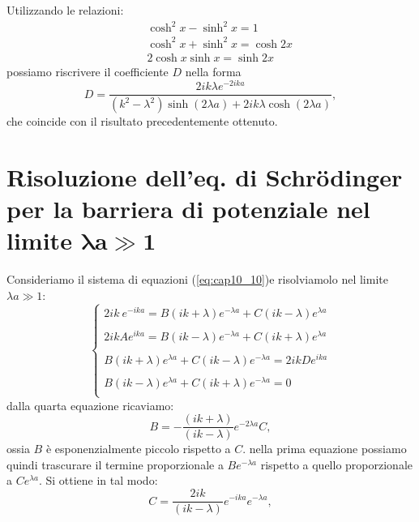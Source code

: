 Utilizzando le relazioni:
\begin{eqnarray}
& &\cosh ^2 x - \sinh ^2 x=1 \nonumber \\
& &\cosh ^2 x + \sinh ^2 x=\cosh 2x  \\
& &2 \cosh  x \sinh  x=\sinh 2x \nonumber 
\end{eqnarray}
possiamo riscrivere il coefficiente $D$ nella forma
\begin{equation}
D=\frac{2ik\lambda e^{-2ika}}{\left(k^2-\lambda^2\right)\sinh \left(2\lambda a\right)+2ik\lambda \cosh\left(2\lambda a\right)},
\end{equation}
che coincide con il risultato precedentemente ottenuto.
\section{Risoluzione dell'eq. di Schr\"{o}dinger per la barriera di potenziale nel limite $\mathbf{\lambda a \gg 1}$}
Consideriamo il sistema di equazioni (\ref{eq:cap10_10})e risolviamolo nel limite $\lambda a \gg 1$:
\begin{equation}
\begin{cases}
\displaystyle{2ik\ e^{-ika}=B\left( ik+\lambda\right)e^{-\lambda a} + C\left( ik-\lambda\right)e^{\lambda a}}\\
\\
\displaystyle{2ikA e^{ika}=B\left( ik-\lambda\right)e^{-\lambda a} + C\left( ik+\lambda\right)e^{\lambda a}}\\
\\
\displaystyle{B\left( ik+\lambda\right)e^{\lambda a} + C\left( ik-\lambda\right)e^{-\lambda a}}= 2ikD e^{ika}\\
\\
\displaystyle{B\left( ik-\lambda\right)e^{\lambda a} + C\left( ik+\lambda\right)e^{-\lambda a}}= 0\\
\end{cases}
\end{equation} 
dalla quarta equazione ricaviamo:
\begin{equation}
B=-\frac{(ik+\lambda)}{(ik-\lambda)}e^{-2 \lambda a } C,
\end{equation}
ossia $B$ è esponenzialmente piccolo rispetto a $C$.  nella prima equazione possiamo quindi trascurare il termine proporzionale a $Be^{-\lambda a}$ rispetto a quello proporzionale a $Ce^{\lambda a }$. Si ottiene in tal modo:
\begin{equation}
C= \frac{2ik}{(ik-\lambda)}e^{-ika}e^{-\lambda a},
\end{equation}
